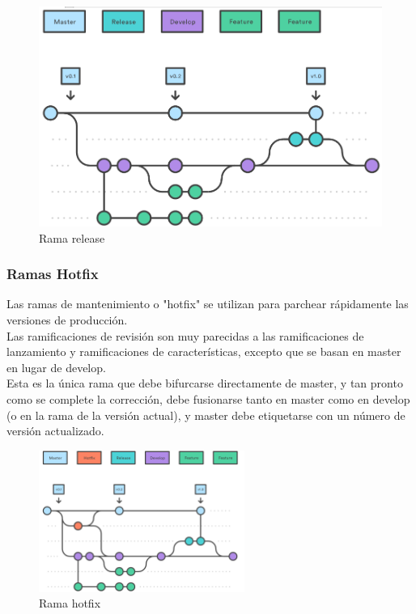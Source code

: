 \begin{figure}[htb]
	\centering
	\includegraphics[width=1\textwidth]{./imagenes/release}
	\caption{Rama release}
\end{figure}
\FloatBarrier

\subsubsection{Ramas Hotfix}

\quad Las ramas de mantenimiento o "hotfix" se utilizan para parchear rápidamente las versiones de producción.\\

\quad Las ramificaciones de revisión son muy parecidas a las ramificaciones de lanzamiento y ramificaciones de características, excepto que se basan en master en lugar de develop.\\

\quad Esta es la única rama que debe bifurcarse directamente de master, y tan pronto como se complete la corrección, debe fusionarse tanto en master como en develop (o en la rama de la versión actual), y master debe etiquetarse con un número de versión actualizado.\\

\begin{figure}[htb]
	\centering
	\includegraphics[width=0.6\textwidth]{./imagenes/hotfix}
	\caption{Rama hotfix}
\end{figure}
\FloatBarrier

\newpage
